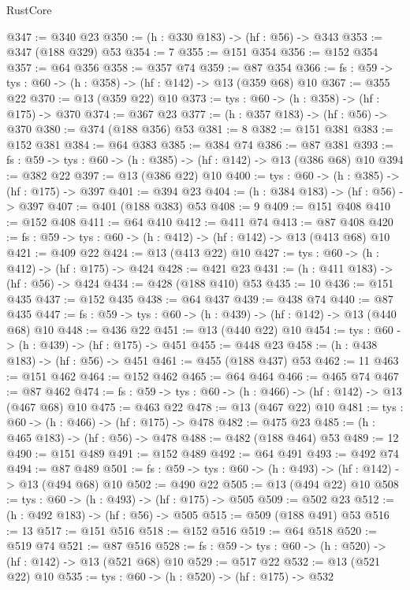 \begin{lexlean}{RustCore}
\begin{coremodule}
@347 := @340 @23
@350 := (h : @330 @183) -> (hf : @56) -> @343
@353 := @347 (@188 @329) @53
@354 := 7
@355 := @151 @354
@356 := @152 @354
@357 := @64 @356
@358 := @357 @74
@359 := @87 @354
@366 := {fs : @59} -> {tys : @60} -> (h : @358) -> (hf : @142) -> @13 (@359 @68) @10
@367 := @355 @22
@370 := @13 (@359 @22) @10
@373 := {tys : @60} -> (h : @358) -> (hf : @175) -> @370
@374 := @367 @23
@377 := (h : @357 @183) -> (hf : @56) -> @370
@380 := @374 (@188 @356) @53
@381 := 8
@382 := @151 @381
@383 := @152 @381
@384 := @64 @383
@385 := @384 @74
@386 := @87 @381
@393 := {fs : @59} -> {tys : @60} -> (h : @385) -> (hf : @142) -> @13 (@386 @68) @10
@394 := @382 @22
@397 := @13 (@386 @22) @10
@400 := {tys : @60} -> (h : @385) -> (hf : @175) -> @397
@401 := @394 @23
@404 := (h : @384 @183) -> (hf : @56) -> @397
@407 := @401 (@188 @383) @53
@408 := 9
@409 := @151 @408
@410 := @152 @408
@411 := @64 @410
@412 := @411 @74
@413 := @87 @408
@420 := {fs : @59} -> {tys : @60} -> (h : @412) -> (hf : @142) -> @13 (@413 @68) @10
@421 := @409 @22
@424 := @13 (@413 @22) @10
@427 := {tys : @60} -> (h : @412) -> (hf : @175) -> @424
@428 := @421 @23
@431 := (h : @411 @183) -> (hf : @56) -> @424
@434 := @428 (@188 @410) @53
@435 := 10
@436 := @151 @435
@437 := @152 @435
@438 := @64 @437
@439 := @438 @74
@440 := @87 @435
@447 := {fs : @59} -> {tys : @60} -> (h : @439) -> (hf : @142) -> @13 (@440 @68) @10
@448 := @436 @22
@451 := @13 (@440 @22) @10
@454 := {tys : @60} -> (h : @439) -> (hf : @175) -> @451
@455 := @448 @23
@458 := (h : @438 @183) -> (hf : @56) -> @451
@461 := @455 (@188 @437) @53
@462 := 11
@463 := @151 @462
@464 := @152 @462
@465 := @64 @464
@466 := @465 @74
@467 := @87 @462
@474 := {fs : @59} -> {tys : @60} -> (h : @466) -> (hf : @142) -> @13 (@467 @68) @10
@475 := @463 @22
@478 := @13 (@467 @22) @10
@481 := {tys : @60} -> (h : @466) -> (hf : @175) -> @478
@482 := @475 @23
@485 := (h : @465 @183) -> (hf : @56) -> @478
@488 := @482 (@188 @464) @53
@489 := 12
@490 := @151 @489
@491 := @152 @489
@492 := @64 @491
@493 := @492 @74
@494 := @87 @489
@501 := {fs : @59} -> {tys : @60} -> (h : @493) -> (hf : @142) -> @13 (@494 @68) @10
@502 := @490 @22
@505 := @13 (@494 @22) @10
@508 := {tys : @60} -> (h : @493) -> (hf : @175) -> @505
@509 := @502 @23
@512 := (h : @492 @183) -> (hf : @56) -> @505
@515 := @509 (@188 @491) @53
@516 := 13
@517 := @151 @516
@518 := @152 @516
@519 := @64 @518
@520 := @519 @74
@521 := @87 @516
@528 := {fs : @59} -> {tys : @60} -> (h : @520) -> (hf : @142) -> @13 (@521 @68) @10
@529 := @517 @22
@532 := @13 (@521 @22) @10
@535 := {tys : @60} -> (h : @520) -> (hf : @175) -> @532

\end{coremodule}
\end{lexlean}
